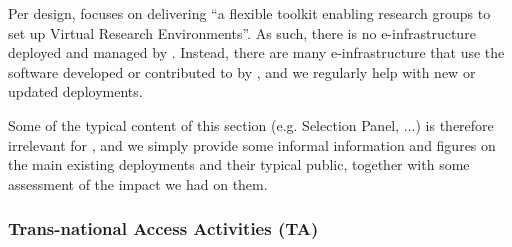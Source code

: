 \documentclass{deliverablereport}
\begin{document}
Per design, \ODK focuses on delivering ``a flexible toolkit enabling
research groups to set up Virtual Research Environments''. As such,
there is no e-infrastructure deployed and managed by \ODK. Instead,
there are many e-infrastructure that use the software developed or
contributed to by \ODK, and we regularly help with new or updated
deployments.

Some of the typical content of this section (e.g. Selection Panel,
...) is therefore irrelevant for \ODK, and we simply provide some
informal information and figures on the main existing deployments and
their typical public, together with some assessment of the impact we
had on them.


  \subsubsection{Trans-national Access Activities (TA)}






\end{document}
